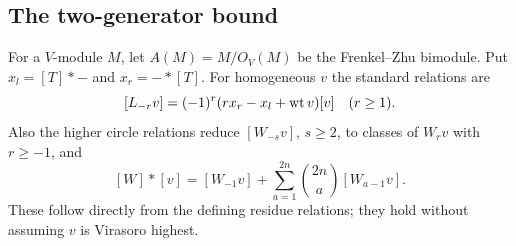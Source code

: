 \documentclass[11pt]{article}
\numberwithin{equation}{section}
\begin{document}
\subsection{The two-generator bound}\label{B:sec:twogen}
For a $V$-module $M$, let $A(M)=M/O_V(M)$ be the Frenkel--Zhu bimodule. Put $x_l=[T]*-$ and $x_r=-*[T]$. For homogeneous $v$ the standard relations are
\begin{equation}\label{B:ZhuVir}
 [L_{-r}v]=(-1)^r(rx_r-x_l+\operatorname{wt} v)[v]\quad(r\geq1).
\end{equation}
Also the higher circle relations reduce $[W_{-s}v]$, $s\geq2$, to classes of $W_rv$ with $r\geq-1$, and
\begin{equation}\label{B:ZhuW}
 [W]*[v]=[W_{-1}v]+\sum_{a=1}^{2n}\binom{2n}{a}[W_{a-1}v].
\end{equation}
These follow directly from the defining residue relations; they hold without assuming $v$ is Virasoro highest.
\end{document}
